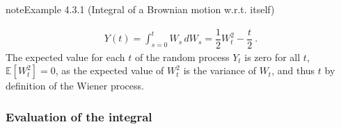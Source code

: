 \documentclass[letterpaper,10pt,english]{jupyterBook}
\begin{document}
\begin{sphinxadmonition}{note}{Example 4.3.1 (Integral of a Brownian motion w.r.t. itself)}


\begin{equation*}
\begin{split}Y(t) = \int_{s=0}^t W_s \, dW_s = \dfrac{1}{2} W_t^2 - \dfrac{t}{2} \ .\end{split}
\end{equation*}
\sphinxAtStartPar
The expected value for each \(t\) of the random process \(Y_t\) is zero for all \(t\), \(\mathbb{E}\left[ W_t^2 \right]= 0\), as the expected value of \(W_t^2\) is the variance of \(W_t\), and thus \(t\) by definition of the Wiener process.
\subsubsection*{Evaluation of the integral}


\end{sphinxadmonition}
\end{document}
